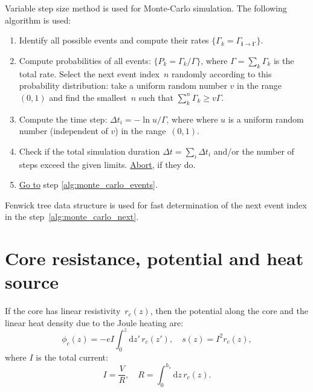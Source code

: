 \documentclass[10pt]{article}
\newcommand{\dd}{\mathrm{d}}
\renewcommand{\vec}[1]{\mathbf{#1}}
\newcommand{\vi}{\vec{i}}
\begin{document}
Variable step size method is used for Monte-Carlo simulation. The following
algorithm is used:

\begin{enumerate}
	\item \label{alg:monte_carlo_events} Identify all possible events and compute
	      their rates $\{ \Gamma_k = \Gamma_{\vi \to \vi'} \}$.

	\item \label{alg:monte_carlo_next} Compute probabilities of all events:
		  $\{ P_k = \Gamma_k / \Gamma \}$, where $\Gamma = \sum_k \Gamma_k$ is the
		  total rate. Select the next event index~$n$ randomly according to this
		  probability distribution: take a uniform random number $v$ in the
		  range~$(0, 1)$ and find the smallest~$n$ such that
		  $\sum_k^n \Gamma_k \geq v\Gamma$.

	\item Compute the time step: $\Delta t_i = -\ln u / \Gamma$, where where $u$
	      is a uniform random number (independent of $v$) in the range~$(0, 1)$.

	\item Check if the total simulation duration $\Delta t = \sum_i \Delta t_i$
		  and/or the number of steps exceed the given limits. \underline{Abort},
		  if they do.

	\item \underline{Go to} step \ref{alg:monte_carlo_events}.
\end{enumerate}

Fenwick tree data structure is used for fast determination of the next event
index in the step~\ref{alg:monte_carlo_next}.

\section{Core resistance, potential and heat source}

If the core has linear resistivity~$r_c(z)$, then the potential along the core
and the linear heat density due to the Joule heating are:
\begin{equation}
	\phi_c(z) = -e I \int_0^z \dd z'\, r_c(z'), \quad
	s(z) = I^2 r_c(z),
\end{equation}
where $I$ is the total current:
\begin{equation}
	I = \frac{V}{R}, \quad R = \int_0^{h_s} \dd z\, r_c(z).
\end{equation}
\end{document}
